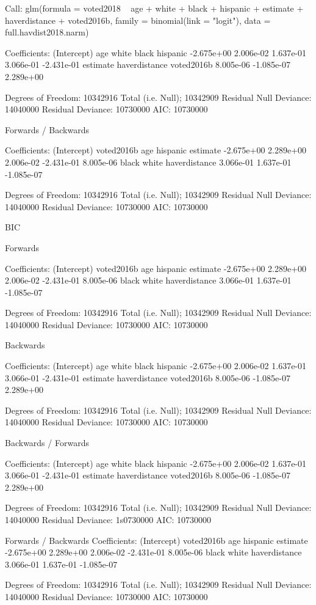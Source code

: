Call:  glm(formula = voted2018 ~ age + white + black + hispanic + estimate +
    haverdistance + voted2016b, family = binomial(link = "logit"),
    data = full.havdist2018.narm)

Coefficients:
  (Intercept)            age          white          black       hispanic
   -2.675e+00      2.006e-02      1.637e-01      3.066e-01     -2.431e-01
     estimate  haverdistance     voted2016b
    8.005e-06     -1.085e-07      2.289e+00

Degrees of Freedom: 10342916 Total (i.e. Null);  10342909 Residual
Null Deviance:	    14040000
Residual Deviance: 10730000 	AIC: 10730000


Forwards / Backwards

Coefficients:
  (Intercept)     voted2016b            age       hispanic       estimate
   -2.675e+00      2.289e+00      2.006e-02     -2.431e-01      8.005e-06
        black          white  haverdistance
    3.066e-01      1.637e-01     -1.085e-07

Degrees of Freedom: 10342916 Total (i.e. Null);  10342909 Residual
Null Deviance:	    14040000
Residual Deviance: 10730000 	AIC: 10730000




BIC


Forwards

Coefficients:
  (Intercept)     voted2016b            age       hispanic       estimate
   -2.675e+00      2.289e+00      2.006e-02     -2.431e-01      8.005e-06
        black          white  haverdistance
    3.066e-01      1.637e-01     -1.085e-07

Degrees of Freedom: 10342916 Total (i.e. Null);  10342909 Residual
Null Deviance:	    14040000
Residual Deviance: 10730000 	AIC: 10730000



Backwards

Coefficients:
  (Intercept)            age          white          black       hispanic
   -2.675e+00      2.006e-02      1.637e-01      3.066e-01     -2.431e-01
     estimate  haverdistance     voted2016b
    8.005e-06     -1.085e-07      2.289e+00

Degrees of Freedom: 10342916 Total (i.e. Null);  10342909 Residual
Null Deviance:	    14040000
Residual Deviance: 10730000 	AIC: 10730000


Backwards / Forwards

Coefficients:
  (Intercept)            age          white          black       hispanic
   -2.675e+00      2.006e-02      1.637e-01      3.066e-01     -2.431e-01
     estimate  haverdistance     voted2016b
    8.005e-06     -1.085e-07      2.289e+00

Degrees of Freedom: 10342916 Total (i.e. Null);  10342909 Residual
Null Deviance:	    14040000
Residual Deviance: 1s0730000 	AIC: 10730000

Forwards / Backwards
Coefficients:
  (Intercept)     voted2016b            age       hispanic       estimate
   -2.675e+00      2.289e+00      2.006e-02     -2.431e-01      8.005e-06
        black          white  haverdistance
    3.066e-01      1.637e-01     -1.085e-07

Degrees of Freedom: 10342916 Total (i.e. Null);  10342909 Residual
Null Deviance:	    14040000
Residual Deviance: 10730000 	AIC: 10730000
